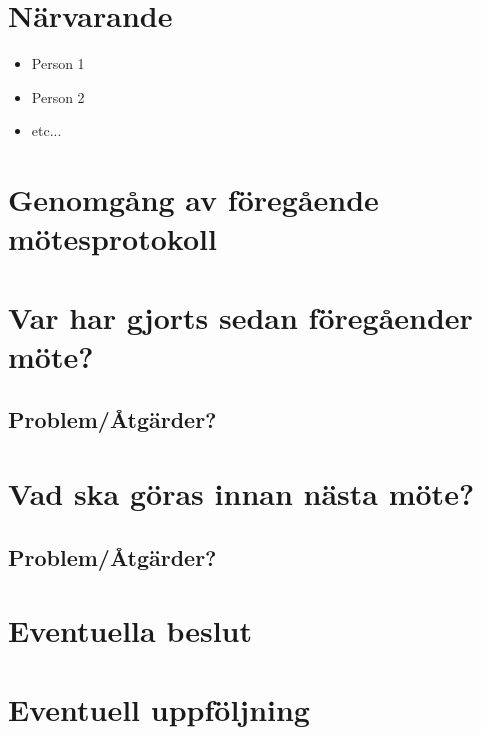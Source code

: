 \section*{Närvarande}
\begin{itemize}
    \itemsep0em
    \item Person 1
    \item Person 2
    \item etc...
\end{itemize}

\section*{Genomgång av föregående mötesprotokoll}


\section*{Var har gjorts sedan föregåender möte?}

\subsection*{Problem/Åtgärder?}


\section*{Vad ska göras innan nästa möte?}

\subsection*{Problem/Åtgärder?}


\section*{Eventuella beslut}

\section*{Eventuell uppföljning}